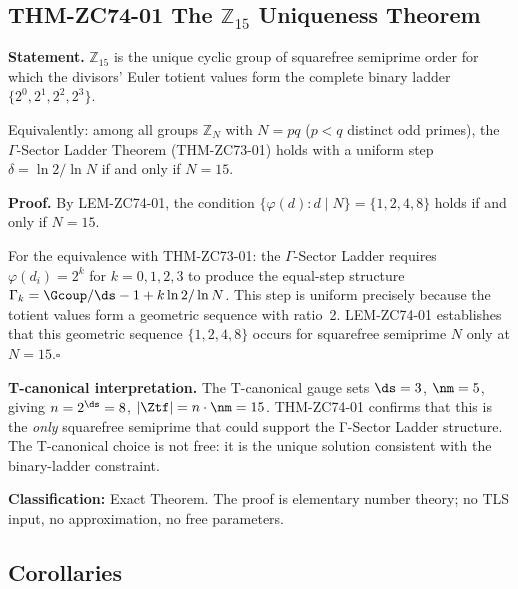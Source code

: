 \documentclass[12pt, a4paper]{article}
\begin{document}
\subsection{THM-ZC74-01 \quad The $\mathbb{Z}_{15}$ Uniqueness Theorem}
\label{sec:thm01}


\begin{formalbox}[title={THM-ZC74-01: $\mathbb{Z}_{15}$ Uniqueness Theorem
  ($R_0$, Exact)}]

\textbf{Statement.}
$\mathbb{Z}_{15}$ is the unique cyclic group of squarefree semiprime
order for which the divisors' Euler totient values form the complete
binary ladder $\{2^0, 2^1, 2^2, 2^3\}$.

Equivalently: among all groups $\mathbb{Z}_N$ with $N = pq$
($p < q$ distinct odd primes), the $\Gamma$-Sector Ladder Theorem
(THM-ZC73-01) holds with a uniform step
$\delta = \ln 2/\ln N$ if and only if $N = 15$.

\textbf{Proof.}
By LEM-ZC74-01, the condition
$\{\varphi(d) : d \mid N\} = \{1, 2, 4, 8\}$ holds if and only if
$N = 15$.

For the equivalence with THM-ZC73-01: the $\Gamma$-Sector Ladder
requires $\varphi(d_i) = 2^k$ for $k = 0, 1, 2, 3$ to produce the
equal-step structure
$\Gamma_k = \Gcoup/\ds - 1 + k\ln2/\ln N$.
This step is uniform precisely because the totient values form a
geometric sequence with ratio~2. LEM-ZC74-01 establishes that this
geometric sequence $\{1, 2, 4, 8\}$ occurs for squarefree semiprime
$N$ only at $N = 15$.\hfill$\square$

\textbf{T-canonical interpretation.}
The T-canonical gauge sets $\ds = 3$, $\nm = 5$, giving
$n = 2^{\ds} = 8$, $|\Ztf| = n \cdot \nm = 15$.
THM-ZC74-01 confirms that this is the \emph{only} squarefree semiprime
that could support the Γ-Sector Ladder structure.
The T-canonical choice is not free: it is the unique solution
consistent with the binary-ladder constraint.

\textbf{Classification:} Exact Theorem.
The proof is elementary number theory; no TLS input, no
approximation, no free parameters.
\end{formalbox}

\subsection{Corollaries}
\label{sec:cors}
\end{document}
